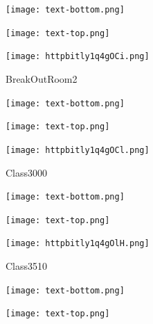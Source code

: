 \documentclass[letterpaper]{article}
\begin{document}
 \centerline{\texttt{[image: text-bottom.png]}} 
 
 \pagebreak 
{} 
 \vspace*{\fill} 
 
  \centerline{\texttt{[image: text-top.png]}} 
 
 \vspace{0.5in} 
 
 \begingroup 
 \centerline{\texttt{[image: httpbitly1q4gOCi.png]}} 
 \endgroup 
 \vspace*{\fill} 

 \hfill{\small BreakOutRoom2} 

  \vspace{0.7in} 
 
 \centerline{\texttt{[image: text-bottom.png]}} 
 
 \pagebreak 
{} 
 \vspace*{\fill} 
 
  \centerline{\texttt{[image: text-top.png]}} 
 
 \vspace{0.5in} 
 
 \begingroup 
 \centerline{\texttt{[image: httpbitly1q4gOCl.png]}} 
 \endgroup 
 \vspace*{\fill} 

 \hfill{\small Class3000} 

  \vspace{0.7in} 
 
 \centerline{\texttt{[image: text-bottom.png]}} 
 
 \pagebreak 
{} 
 \vspace*{\fill} 
 
  \centerline{\texttt{[image: text-top.png]}} 
 
 \vspace{0.5in} 
 
 \begingroup 
 \centerline{\texttt{[image: httpbitly1q4gOlH.png]}} 
 \endgroup 
 \vspace*{\fill} 

 \hfill{\small Class3510} 

  \vspace{0.7in} 
 
 \centerline{\texttt{[image: text-bottom.png]}} 
 
 \pagebreak 
{} 
 \vspace*{\fill} 
 
  \centerline{\texttt{[image: text-top.png]}} 
 
 \vspace{0.5in} 
 
\end{document}
